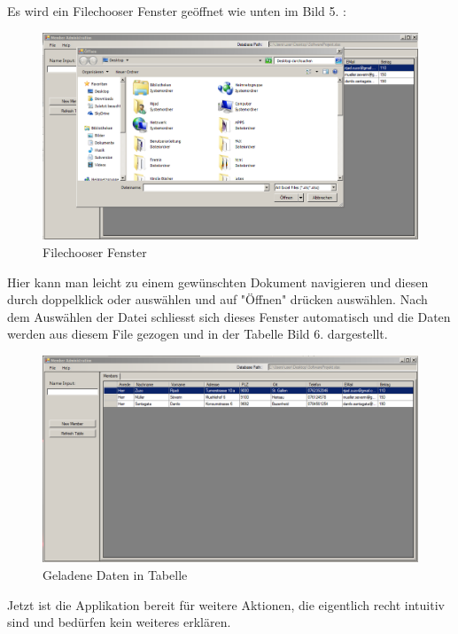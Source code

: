 \documentclass{article}
\begin{document}
Es wird ein Filechooser Fenster geöffnet wie unten im Bild 5. :
\begin{figure}[h]
	\begin{center}
		\includegraphics[width=0.8\paperwidth]{Filechooser}
		\caption{Filechooser Fenster}
	\end{center}
\end{figure}

Hier kann man leicht zu einem gewünschten Dokument navigieren und diesen durch doppelklick oder auswählen und auf "Öffnen" drücken auswählen. Nach dem Auswählen der Datei schliesst sich dieses Fenster automatisch und die Daten werden aus diesem File gezogen und in der Tabelle Bild 6. dargestellt.

\newpage

\begin{figure}[h]
	\begin{center}
		\includegraphics[width=0.8\paperwidth]{printscreen}
		\caption{Geladene Daten in Tabelle}
	\end{center}
\end{figure}

Jetzt ist die Applikation bereit für weitere Aktionen, die eigentlich recht intuitiv sind und bedürfen kein weiteres erklären. 
\end{document}
